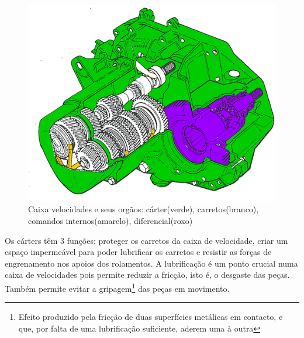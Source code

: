 \begin{figure}[H]
\centering
\includegraphics[scale=1.0]{figs/caixa}
\caption{Caixa velocidades e seus orgãos: cárter(verde), carretos(branco), comandos internos(amarelo), diferencial(roxo)}\label{caixa_velocidades}
\end{figure}

Os cárters têm 3 funções: proteger os carretos da caixa de velocidade, criar um espaço impermeável para poder lubrificar os carretos e resistir as forças de engrenamento nos apoios dos rolamentos. A lubrificação é um ponto crucial numa caixa de velocidades pois permite reduzir a fricção, isto é, o desgaste das peças. Também permite evitar a gripagem\footnote{Efeito produzido pela fricção de duas superfícies metálicas em contacto, e que, por falta de uma lubrificação suficiente, aderem uma à outra} das peças em movimento.

